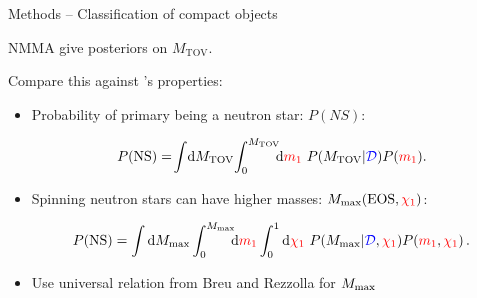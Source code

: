 \documentclass[usenames,dvipsnames,t]{beamer}
\newcommand{\mtov}{M_{\text{TOV}}}
\begin{document}
\begin{frame}{Methods -- Classification of compact objects}
  
  \def\x{3mm}

  \textsc{NMMA}  give posteriors on $\mtov$. 
  
  Compare this against 's properties:

  \begin{itemize}
    \vspace{\x}

    \item Probability of primary being a neutron star: $P(NS)$:
    
    \begin{equation*}
      P(\text{NS}) = \!\int \!\differential\mtov \!\int_{0}^{\mtov}\! \! \! \differential \red{m_1} \ P(\mtov|\blue{\mathcal{D}}) P(\red{m_1}).
    \end{equation*}

    \vspace{\x}

    \item Spinning neutron stars can have higher masses: $M_{\rm{max}}(\rm{EOS}, \textcolor{red}{\chi_1})$:
    
    \begin{equation*}
      P(\text{NS}) = \int \differential M_{\rm{max}}\int_{0}^{M_{\rm{max}}} \! \! \!\differential \red{m_1} \int_0^1 \differential \red{\chi_1} \ P(M_{\rm{max}}|\blue{\mathcal{D}}, \red{\chi_1}) P(\red{m_1}, \red{\chi_1}) \, .
    \end{equation*}

    \vspace{\x}

    \item Use universal relation from Breu and Rezzolla for $M_{\rm{max}}$~\cite{Breu:2016ufb}
  \end{itemize}

\end{frame}
\end{document}
